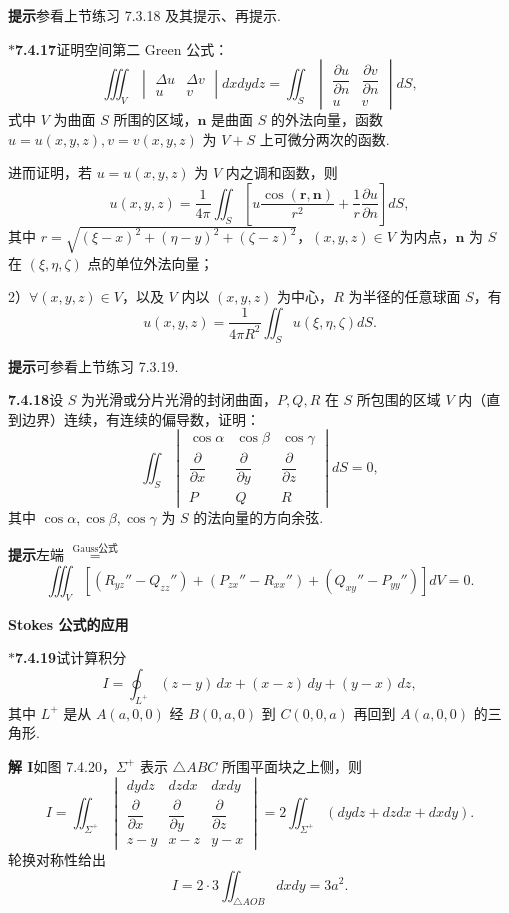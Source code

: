 \documentclass[UTF8, 12pt, fontset=fandol, oneside]{ctexart}
\providecommand{\xlongequal}[1]{\overset{#1}{=}}
\begin{document}
\noindent\textbf{提示}\quad 参看上节练习 7.3.18 及其提示、再提示.

\noindent\textbf{$*$7.4.17}\quad 证明空间第二 Green 公式：
\[
\iiint_V
\begin{vmatrix}
\Delta u & \Delta v\\
u & v
\end{vmatrix}dxdydz
=\iint_S
\begin{vmatrix}
\dfrac{\partial u}{\partial n} & \dfrac{\partial v}{\partial n}\\
u & v
\end{vmatrix}dS,
\]
式中 $V$ 为曲面 $S$ 所围的区域，$\mathbf n$ 是曲面 $S$ 的外法向量，函数 $u=u(x,y,z),v=v(x,y,z)$ 为 $V+S$ 上可微分两次的函数.

进而证明，若 $u=u(x,y,z)$ 为 $V$ 内之调和函数，则
\[
u(x,y,z)=\frac1{4\pi}\iint_S\left[u\frac{\cos(\mathbf r,\mathbf n)}{r^2}+\frac1r\frac{\partial u}{\partial n}\right]dS,
\]
其中 $r=\sqrt{(\xi-x)^2+(\eta-y)^2+(\zeta-z)^2}$，$(x,y,z)\in V$ 为内点，$\mathbf n$ 为 $S$ 在 $(\xi,\eta,\zeta)$ 点的单位外法向量；

2）$\forall(x,y,z)\in V$，以及 $V$ 内以 $(x,y,z)$ 为中心，$R$ 为半径的任意球面 $S$，有
\[
u(x,y,z)=\frac1{4\pi R^2}\iint_Su(\xi,\eta,\zeta)dS.
\]

\noindent\textbf{提示}\quad 可参看上节练习 7.3.19.

\noindent\textbf{7.4.18}\quad 设 $S$ 为光滑或分片光滑的封闭曲面，$P,Q,R$ 在 $S$ 所包围的区域 $V$ 内（直到边界）连续，有连续的偏导数，证明：
\[
\iint_S
\begin{vmatrix}
\cos\alpha & \cos\beta & \cos\gamma\\
\dfrac{\partial}{\partial x} & \dfrac{\partial}{\partial y} & \dfrac{\partial}{\partial z}\\
P & Q & R
\end{vmatrix}dS=0,
\]
其中 $\cos\alpha,\cos\beta,\cos\gamma$ 为 $S$ 的法向量的方向余弦.

\noindent\textbf{提示}\quad 左端 $\xlongequal{\text{Gauss公式}}$
\[
\iiint_V\left[(R_{yz}''-Q_{zz}'')+(P_{zx}''-R_{xx}'')+(Q_{xy}''-P_{yy}'')\right]dV=0.
\]

\noindent\textbf{Stokes 公式的应用}

\noindent\textbf{$*$7.4.19}\quad 试计算积分
\[
I=\oint_{L^+}(z-y)\,dx+(x-z)\,dy+(y-x)\,dz,
\]
其中 $L^+$ 是从 $A(a,0,0)$ 经 $B(0,a,0)$ 到 $C(0,0,a)$ 再回到 $A(a,0,0)$ 的三角形.

\noindent\textbf{解 I}\quad 如图 7.4.20，$\Sigma^+$ 表示 $\triangle ABC$ 所围平面块之上侧，则
\[
I=\iint_{\Sigma^+}
\begin{vmatrix}
dydz & dzdx & dxdy\\
\dfrac{\partial}{\partial x} & \dfrac{\partial}{\partial y} & \dfrac{\partial}{\partial z}\\
z-y & x-z & y-x
\end{vmatrix}
=2\iint_{\Sigma^+}(dydz+dzdx+dxdy).
\]
轮换对称性给出
\[
I=2\cdot3\iint_{\triangle AOB}dxdy=3a^2.
\]
\end{document}
